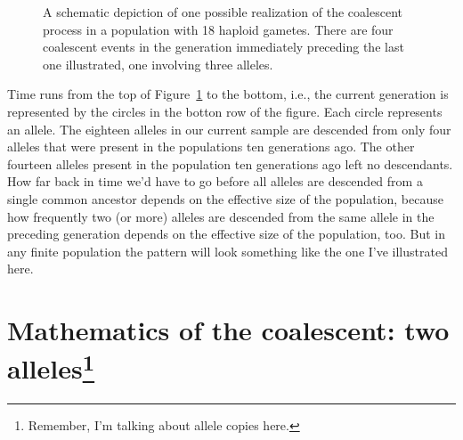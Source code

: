 \begin{figure}
\begin{center}
\end{center}
\caption{A schematic depiction of one possible realization of the
  coalescent process in a population with 18 haploid gametes. There
  are four coalescent events in the generation immediately preceding
  the last one illustrated, one involving three alleles.}\label{fig:coalescent}
\end{figure}

Time runs from the top of Figure~\ref{fig:coalescent} to the bottom,
i.e., the current generation is represented by the circles in the
botton row of the figure. Each circle represents an allele. The
eighteen alleles in our current sample are descended from only four
alleles that were present in the populations ten generations ago. The
other fourteen alleles present in the population ten generations ago
left no descendants. How far back in time we'd have to go before all
alleles are descended from a single common ancestor depends on the
effective size of the population, because how frequently two (or more)
alleles are descended from the same allele in the preceding generation
depends on the effective size of the population, too. But in any
finite population the pattern will look something like the one I've
illustrated here.

\section*{Mathematics of the coalescent: two
  alleles\footnote{Remember, I'm
  talking about allele copies here.}}

